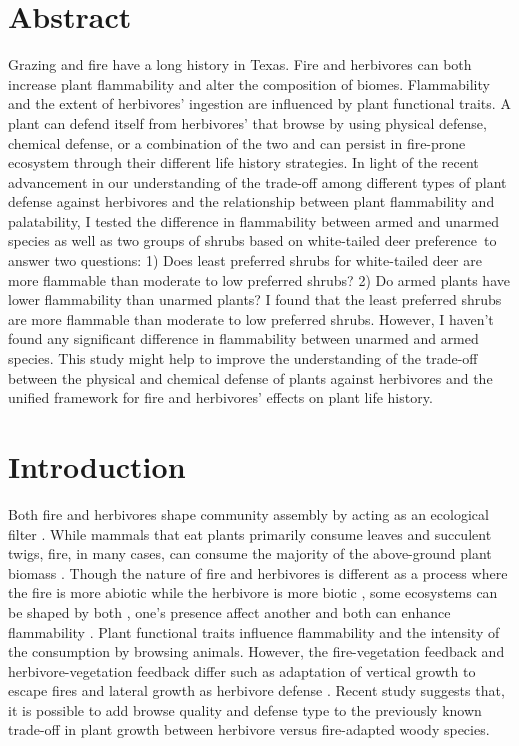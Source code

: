 \documentclass[12pt]{report}
\begin{document}
\section{Abstract}

Grazing and fire have a long history in Texas. Fire and herbivores can both increase plant flammability and alter the composition of biomes. Flammability and the extent of herbivores' ingestion are influenced by plant functional traits. A plant can defend itself from herbivores' that browse by using physical defense, chemical defense, or a combination of the two and can persist in fire-prone ecosystem through their different life history strategies. In light of the recent advancement in our understanding of the trade-off among different types of plant defense against herbivores and the relationship between plant flammability and palatability, I tested the difference in flammability between armed and unarmed species as well as two groups of shrubs based on white-tailed deer preference to answer two questions: 1) Does least preferred shrubs for white-tailed deer are more flammable than moderate to low preferred shrubs? 2) Do armed plants have lower flammability than unarmed plants? I found that the least preferred shrubs are more flammable than moderate to low preferred shrubs. However, I haven't found any significant difference in flammability between
unarmed and armed species. This study might help to improve the understanding of the trade-off between the physical and chemical defense of plants against herbivores and the unified framework for fire and herbivores' effects on plant life history. 


\section{Introduction}

Both fire and herbivores shape community assembly by acting as an ecological filter \citep{belsky1992effects, grazingecologicalfilters, morphospace, verdu2007ecologicalfilter,fireecologicalfitlers}. While mammals that eat plants primarily consume leaves and succulent twigs, fire, in many cases, can consume the majority of the above-ground plant biomass \citep{bond1996fire,globalherbivore}. Though the nature of fire and herbivores is different as a process where the fire is more abiotic while the herbivore is more biotic  \citep{globalherbivore,archibald2019unified}, some ecosystems can be shaped by both \citep{van2003effects,  archibald2005shaping,staver2009browsing,donaldson2018ecological, noy1995interactive}, one's presence affect another\citep{holdo2009grazers, foster2015synergistic} and both can enhance flammability \citep{white1994monoterpenes, owens1998seasonal, Ulex}. Plant functional traits influence flammability and the intensity of the consumption by browsing animals. However, the fire-vegetation feedback and herbivore-vegetation feedback differ such as adaptation of vertical growth to escape fires and lateral growth as herbivore defense \citep{archibald2003growing,staver2012top,moncrieff2011tree}. Recent study \citep{wigley2015mammal} suggests that, it is possible to add browse quality and defense type to the previously known trade-off in plant growth between herbivore versus fire-adapted woody species.
\end{document}
